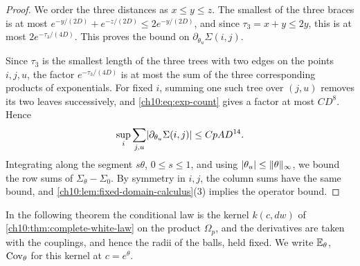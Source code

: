 \begin{proof}
We order the three distances as $x\le y\le z$. The smallest of the three braces is at most $e^{-y/(2D)}+e^{-z/(2D)}\le2e^{-y/(2D)}$, and since $\tau_3=x+y\le2y$, this is at most $2e^{-\tau_3/(4D)}$. This proves the bound on $\partial_{\theta_u}\Sigma(i,j)$.

Since $\tau_3$ is the smallest length of the three trees with two edges on the points $i,j,u$, the factor $e^{-\tau_3/(4D)}$ is at most the sum of the three corresponding products of exponentials. For fixed $i$, summing one such tree over $(j,u)$ removes its two leaves successively, and \eqref{ch10:eq:exp-count} gives a factor at most $CD^8$. Hence
\[
 \sup_i\sum_{j,u}\lvert \partial_{\theta_u}\Sigma(i,j)\rvert\le CpAD^{14}.
\]
Integrating along the segment $s\theta$, $0\le s\le1$, and using $\lvert \theta_u\rvert\le\lVert \theta\rVert_\infty$, we bound the row sums of $\Sigma_\theta-\Sigma_0$. By symmetry in $i,j$, the column sums have the same bound, and \cref{ch10:lem:fixed-domain-calculus}(3) implies the operator bound.
\end{proof}

In the following theorem the conditional law is the kernel $k(c,dw)$ of \cref{ch10:thm:complete-white-law} on the product $\Omega_p$, and the derivatives are taken with the couplings, and hence the radii of the balls, held fixed. We write $\mathbb E_\theta$, $\operatorname{Cov}_\theta$ for this kernel at $c=e^\theta$.

